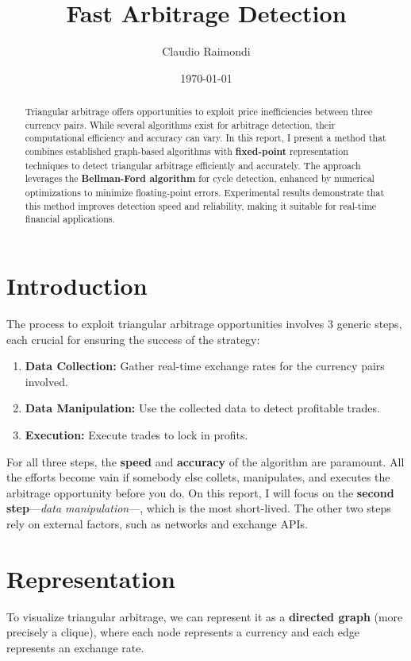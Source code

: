 \documentclass[11pt]{article}
\begin{document}
\title{Fast Arbitrage Detection}
\author{Claudio Raimondi}
\date{\today}
\maketitle

\begin{abstract}
Triangular arbitrage offers opportunities to exploit price inefficiencies between three currency pairs. While several algorithms exist for arbitrage detection, their computational efficiency and accuracy can vary. In this report, I present a method that combines established graph-based algorithms with \textbf{fixed-point} representation techniques to detect triangular arbitrage efficiently and accurately. The approach leverages the \textbf{Bellman-Ford algorithm} for cycle detection, enhanced by numerical optimizations to minimize floating-point errors. Experimental results demonstrate that this method improves detection speed and reliability, making it suitable for real-time financial applications.
\end{abstract}

\tableofcontents

\section{Introduction}
The process to exploit triangular arbitrage opportunities involves 3 generic steps, each crucial for ensuring the success of the strategy:
\begin{enumerate}
    \item \textbf{Data Collection:} Gather real-time exchange rates for the currency pairs involved.
    \item \textbf{Data Manipulation:} Use the collected data to detect profitable trades.
    \item \textbf{Execution:} Execute trades to lock in profits.
\end{enumerate}
For all three steps, the \textbf{speed} and \textbf{accuracy} of the algorithm are paramount. All the efforts become vain if somebody else collets, manipulates, and executes the arbitrage opportunity before you do.
On this report, I will focus on the \textbf{second step}---\textit{data manipulation}---, which is the most short-lived. The other two steps rely on external factors, such as networks and exchange APIs.

\section{Representation}
To visualize triangular arbitrage, we can represent it as a \textbf{directed graph} (more precisely a clique), where each node represents a currency and each edge represents an exchange rate.
\end{document}

